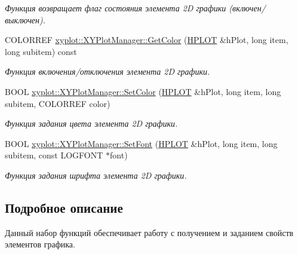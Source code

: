\begin{DoxyCompactItemize}
\begin{DoxyCompactList}\small\item\em Функция возвращает флаг состояния элемента 2\-D графики (включен/выключен). \end{DoxyCompactList}\item 
C\-O\-L\-O\-R\-R\-E\-F \hyperlink{group__gr_elements_ga19d975aa81ed28631a89cb6cfabf80a1}{xyplot\-::\-X\-Y\-Plot\-Manager\-::\-Get\-Color} (\hyperlink{classxyplot_1_1_h_p_l_o_t}{H\-P\-L\-O\-T} \&h\-Plot, long item, long subitem) const 
\begin{DoxyCompactList}\small\item\em Функция включения/отключения элемента 2\-D графики. \end{DoxyCompactList}\item 
B\-O\-O\-L \hyperlink{group__gr_elements_gaea19b965d3f247481ccb5090901d9b33}{xyplot\-::\-X\-Y\-Plot\-Manager\-::\-Set\-Color} (\hyperlink{classxyplot_1_1_h_p_l_o_t}{H\-P\-L\-O\-T} \&h\-Plot, long item, long subitem, C\-O\-L\-O\-R\-R\-E\-F color)
\begin{DoxyCompactList}\small\item\em Функция задания цвета элемента 2\-D графики. \end{DoxyCompactList}\item 
B\-O\-O\-L \hyperlink{group__gr_elements_ga94d466cf2a727291630053fb46796a7b}{xyplot\-::\-X\-Y\-Plot\-Manager\-::\-Set\-Font} (\hyperlink{classxyplot_1_1_h_p_l_o_t}{H\-P\-L\-O\-T} \&h\-Plot, long item, long subitem, const L\-O\-G\-F\-O\-N\-T $\ast$font)
\begin{DoxyCompactList}\small\item\em Функция задания шрифта элемента 2\-D графики. \end{DoxyCompactList}\end{DoxyCompactItemize}


\subsection{Подробное описание}
Данный набор функций обеспечивает работу с получением и заданием свойств элементов графика. 

